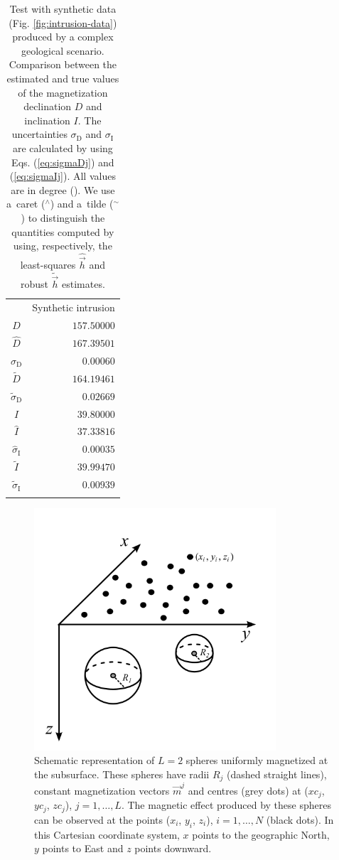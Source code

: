 \documentclass[journal abbreviation, npg]{copernicus}
\begin{document}
\begin{table}[t]
\caption{Test with synthetic data (Fig. \ref{fig:intrusion-data})
produced by a complex geological scenario. Comparison between 
the estimated and
true values of the magnetization declination $D$ and inclination $I$. The
uncertainties $\sigma_\mathrm{D}$ and $\sigma_\mathrm{I}$ are calculated by
using Eqs. (\ref{eq:sigmaDj}) and (\ref{eq:sigmaIj}). All values are in
degree ({\degree}). We use a~caret ($^{\wedge}$) and a~tilde ($^{\sim}$) to
distinguish the quantities computed by using, respectively, the least-squares
$\hat{\vec{h}}$ and robust $\tilde{\vec{h}}$ estimates.}
\begin{tabular}{cr}
\tophline
&Synthetic intrusion \\
\middlehline
$D$ &$157.50000$ \\
$\hat{D}$ &$167.39501$ \\
$\hat{\sigma}_\mathrm{D}$ &$0.00060$  \\
$\tilde{D}$ &$164.19461$ \\
$\tilde{\sigma}_\mathrm{D}$ &$0.02669$ \\
$I$ &$39.80000$ \\
$\hat{I}$ &$37.33816$  \\
$\hat{\sigma}_\mathrm{I}$ &$0.00035$  \\
$\tilde{I}$ &$39.99470$ \\
$\tilde{\sigma}_\mathrm{I}$ &$0.00939$ \\
\bottomhline
\end{tabular}
\label{tab:intrusion-results}
\end{table}


\begin{figure}[t]
\includegraphics[width=90mm]{Figures/npgd-2014-0069-f01}
\caption{Schematic representation of $L = 2$ spheres uniformly
  magnetized at the subsurface. These spheres have radii $R_{j}$
  (dashed straight lines), constant magnetization vectors
  $\vec{m}^{j}$ and centres (grey dots) at ($xc_{j}$, $yc_{j}$, $zc_{j}$),
  $j = 1, \ldots, L$. The magnetic effect produced by these spheres
  can be observed at the points ($x_{i}$, $y_{i}$, $z_{i}$), $i = 1,
  \ldots, N$ (black dots). In this Cartesian coordinate system, $x$
  points to the geographic North, $y$ points to East and $z$ points
  downward.}
\label{fig:geometric-aspects}
\end{figure}
\end{document}
